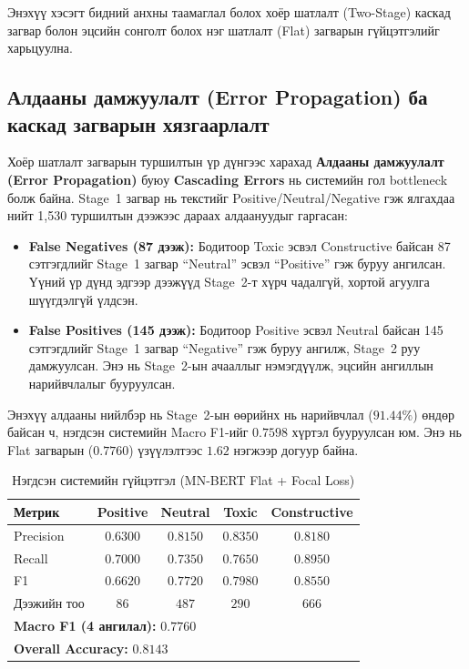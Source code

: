 Энэхүү хэсэгт бидний анхны таамаглал болох хоёр шатлалт (Two-Stage) каскад
загвар болон эцсийн сонголт болох нэг шатлалт (Flat) загварын гүйцэтгэлийг
харьцуулна.

\subsection{Алдааны дамжуулалт (Error Propagation) ба каскад загварын хязгаарлалт}

Хоёр шатлалт загварын туршилтын үр дүнгээс харахад \textbf{Алдааны дамжуулалт
(Error Propagation)} буюу \textbf{Cascading Errors} нь системийн гол bottleneck
болж байна. Stage~1 загвар нь текстийг Positive/Neutral/Negative гэж ялгахдаа
нийт 1,530 туршилтын дээжээс дараах алдаануудыг гаргасан:

\begin{itemize}
    \item \textbf{False Negatives (87 дээж):} Бодитоор Toxic эсвэл Constructive
    байсан 87 сэтгэгдлийг Stage~1 загвар ``Neutral'' эсвэл ``Positive'' гэж
    буруу ангилсан. Үүний үр дүнд эдгээр дээжүүд Stage~2-т хүрч чадалгүй,
    хортой агуулга шүүгдэлгүй үлдсэн.
    \item \textbf{False Positives (145 дээж):} Бодитоор Positive эсвэл Neutral
    байсан 145 сэтгэгдлийг Stage~1 загвар ``Negative'' гэж буруу ангилж,
    Stage~2 руу дамжуулсан. Энэ нь Stage~2-ын ачааллыг нэмэгдүүлж, эцсийн
    ангиллын нарийвчлалыг бууруулсан.
\end{itemize}

Энэхүү алдааны нийлбэр нь Stage~2-ын өөрийнх нь нарийвчлал ($91.44\%$) өндөр
байсан ч, нэгдсэн системийн Macro F1-ийг $0.7598$ хүртэл бууруулсан юм.
Энэ нь Flat загварын ($0.7760$) үзүүлэлтээс $1.62$ нэгжээр догуур байна.

\begin{table}[H]
\centering
\caption{Нэгдсэн системийн гүйцэтгэл (MN-BERT Flat + Focal Loss)}
\label{tab:e2e}
\begin{tabular}{@{}lcccc@{}}
\toprule
\textbf{Метрик} & \textbf{Positive} & \textbf{Neutral} & \textbf{Toxic} & \textbf{Constructive} \\
\midrule
Precision & $0.6300$ & $0.8150$ & $0.8350$ & $0.8180$ \\
Recall    & $0.7000$ & $0.7350$ & $0.7650$ & $0.8950$ \\
F1        & $0.6620$ & $0.7720$ & $0.7980$ & $0.8550$ \\
Дээжийн тоо & $86$ & $487$ & $290$ & $666$ \\
\midrule
\multicolumn{5}{l}{\textbf{Macro F1 (4 ангилал):} $0.7760$} \\
\multicolumn{5}{l}{\textbf{Overall Accuracy:} $0.8143$} \\
\bottomrule
\end{tabular}
\end{table}

